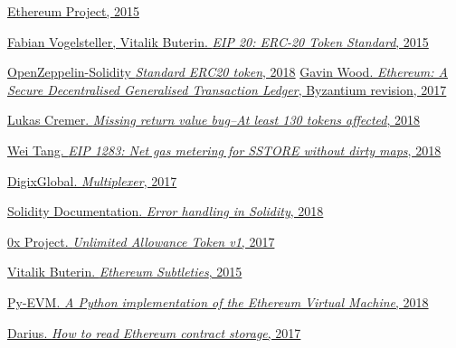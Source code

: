 \documentclass[12pt]{article}
\begin{document}
\begin{thebibliography}{1}

 \href{https://www.ethereum.org}{Ethereum Project, 2015}
 
  \href{https://eips.ethereum.org/EIPS/eip-20}{Fabian Vogelsteller, Vitalik Buterin. {\em EIP 20: ERC-20 Token Standard}, 2015}

  \href{https://github.com/OpenZeppelin/openzeppelin-solidity/blob/v2.0.0/contracts/token/ERC20/ERC20.sol#L151-L164}{OpenZeppelin-Solidity {\em Standard ERC20 token}, 2018}
  \href{http://gavwood.com/paper.pdf}{Gavin Wood. {\em Ethereum: A Secure Decentralised Generalised Transaction Ledger}, Byzantium revision, 2017}
 	
  \href{https://medium.com/p/d67bf08521ca}{Lukas Cremer. {\em Missing return value bug--At least 130 tokens affected}, 2018}
 	
  \href{https://eips.ethereum.org/EIPS/eip-1283}{Wei Tang. {\em EIP 1283: Net gas metering for SSTORE without dirty maps}, 2018}
 	
  \href{https://github.com/DigixGlobal/multiplexer}{DigixGlobal. {\em Multiplexer}, 2017}
 	
  \href{https://solidity.readthedocs.io/en/latest/control-structures.html#error-handling-assert-require-revert-and-exceptions}{Solidity Documentation. {\em Error handling in Solidity}, 2018}
 	
  \href{https://github.com/0xProject/0x-monorepo/blob/48ff13e3e22bf9f71bc1a367f86aaa0ae89989ae/packages/contracts/contracts/tokens/ZRXToken/UnlimitedAllowanceToken_v1.sol#L43-L45}{0x Project. {\em Unlimited Allowance Token v1}, 2017}
 
 \href{https://github.com/ethereum/wiki/wiki/Subtleties}{Vitalik Buterin. {\em Ethereum Subtleties}, 2015}
 
 \href{https://github.com/ethereum/py-evm}{Py-EVM. {\em A Python implementation of the Ethereum Virtual Machine}, 2018}

 \href{https://medium.com/aigang-network/how-to-read-ethereum-contract-storage-44252c8af925}{Darius. {\em How to read Ethereum contract storage}, 2017}

\end{thebibliography}

\appendix
\end{document}
